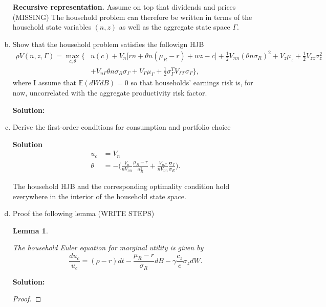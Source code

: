 \documentclass[11pt]{extarticle}
\theoremstyle{plain}
\newtheorem{lem}[thm]{Lemma}
\theoremstyle{definition}
\begin{document}
\begin{enumerate}[(a)]
\vspace{5mm}
\noindent
\textbf{Recursive representation.} Assume on top that dividends and prices (MISSING)
The household problem can therefore be written in terms of the household state variables $(n,z)$ as well as the aggregate state space $\Gamma$. 
\item Show that the household problem satisfies the followign HJB
\begin{align*}
	\rho V(n,z,\Gamma) = \max_{c,\theta} \bigg\{  & u(c) + V_n \Big[ rn + \theta n (\mu_R - r) + wz - c \Big] + \frac{1}{2} V_{nn} (\theta n \sigma_R)^2 +  V_z \mu_z + \frac{1}{2} V_{zz} \sigma_z^2  \\
	& + V_{n \Gamma} \theta n \sigma_R \sigma_\Gamma + V_\Gamma \mu_\Gamma + \frac{1}{2} \sigma_\Gamma^T V_{\Gamma \Gamma} \sigma_\Gamma \bigg\},
\end{align*}
where I assume that $\mathbb{E}(dW dB) = 0$ so that households' earnings risk is, for now, uncorrelated with the aggregate productivity risk factor.

\textbf{Solution:}

\item Derive the first-order conditions for consumption and portfolio choice

\textbf{Solution}
\begin{align*}
	u_c &= V_n \\
	\theta  &= - \bigg( \frac{V_n}{n V_{nn} } \frac{\mu_R - r}{\sigma_R^2 } + \frac{V_{n \Gamma} }{n V_{nn} } \frac{ \bm \sigma_\Gamma }{\sigma_R} \bigg).
\end{align*}


The household HJB and the corresponding optimality condition hold everywhere in the interior of the household state space. 

\item Proof the following lemma (WRITE STEPS)

\begin{lem}\label{lem:MUEuler}
	
	The household Euler equation for marginal utility is given by
	\begin{equation*}
		\frac{d u_c}{u_c} = (\rho - r) dt -  \frac{\mu_R - r}{\sigma_R} dB  - \gamma \frac{c_z}{c} \sigma_z dW .
	\end{equation*}
	
\end{lem}

\textbf{Solution:}

\vspace{2mm}
\noindent
\begin{proof}
	

\end{proof}
\end{enumerate}
\end{document}
